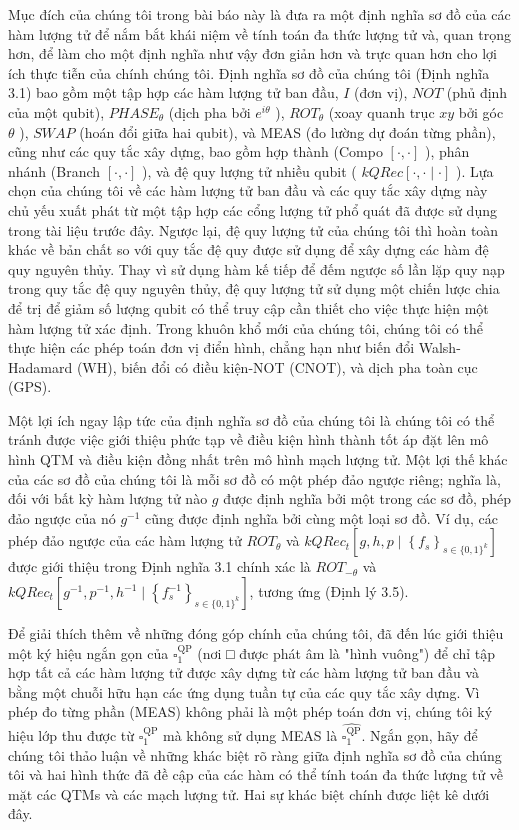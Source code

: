 \documentclass[10pt]{article}
\begin{document}
Mục đích của chúng tôi trong bài báo này là đưa ra một định nghĩa sơ đồ của các hàm lượng tử để nắm bắt khái niệm về tính toán đa thức lượng tử và, quan trọng hơn, để làm cho một định nghĩa như vậy đơn giản hơn và trực quan hơn cho lợi ích thực tiễn của chính chúng tôi. Định nghĩa sơ đồ của chúng tôi (Định nghĩa 3.1) bao gồm một tập hợp các hàm lượng tử ban đầu, $I$ (đơn vị), $N O T$ (phủ định của một qubit), $P H A S E_{\theta}$ (dịch pha bởi $e^{i \theta}$ ), $R O T_{\theta}$ (xoay quanh trục $x y$ bởi góc $\theta$ ), $S W A P$ (hoán đổi giữa hai qubit), và MEAS (đo lường dự đoán từng phần), cũng như các quy tắc xây dựng, bao gồm hợp thành (Compo $[\cdot, \cdot]$ ), phân nhánh (Branch $[\cdot, \cdot]$ ), và đệ quy lượng tử nhiều qubit ( $k Q R e c[\cdot, \cdot \mid \cdot]$ ). Lựa chọn của chúng tôi về các hàm lượng tử ban đầu và các quy tắc xây dựng này chủ yếu xuất phát từ một tập hợp các cổng lượng tử phổ quát đã được sử dụng trong tài liệu trước đây. Ngược lại, đệ quy lượng tử của chúng tôi thì hoàn toàn khác về bản chất so với quy tắc đệ quy được sử dụng để xây dựng các hàm đệ quy nguyên thủy. Thay vì sử dụng hàm kế tiếp để đếm ngược số lần lặp quy nạp trong quy tắc đệ quy nguyên thủy, đệ quy lượng tử sử dụng một chiến lược chia để trị để giảm số lượng qubit có thể truy cập cần thiết cho việc thực hiện một hàm lượng tử xác định. Trong khuôn khổ mới của chúng tôi, chúng tôi có thể thực hiện các phép toán đơn vị điển hình, chẳng hạn như biến đổi Walsh-Hadamard (WH), biến đổi có điều kiện-NOT (CNOT), và dịch pha toàn cục (GPS).

Một lợi ích ngay lập tức của định nghĩa sơ đồ của chúng tôi là chúng tôi có thể tránh được việc giới thiệu phức tạp về điều kiện hình thành tốt áp đặt lên mô hình QTM và điều kiện đồng nhất trên mô hình mạch lượng tử. Một lợi thế khác của các sơ đồ của chúng tôi là mỗi sơ đồ có một phép đảo ngược riêng; nghĩa là, đối với bất kỳ hàm lượng tử nào $g$ được định nghĩa bởi một trong các sơ đồ, phép đảo ngược của nó $g^{-1}$ cũng được định nghĩa bởi cùng một loại sơ đồ. Ví dụ, các phép đảo ngược của các hàm lượng tử $R O T_{\theta}$ và $k Q R e c_{t}\left[g, h, p \mid\left\{f_{s}\right\}_{s \in\{0,1\}^{k}}\right]$ được giới thiệu trong Định nghĩa 3.1 chính xác là $R O T_{-\theta}$ và $k Q R e c_{t}\left[g^{-1}, p^{-1}, h^{-1} \mid\left\{f_{s}^{-1}\right\}_{s \in\{0,1\}^{k}}\right]$, tương ứng (Định lý 3.5).

Để giải thích thêm về những đóng góp chính của chúng tôi, đã đến lúc giới thiệu một ký hiệu ngắn gọn của $\square_{1}^{\mathrm{QP}}$ (nơi □ được phát âm là "hình vuông") để chỉ tập hợp tất cả các hàm lượng tử được xây dựng từ các hàm lượng tử ban đầu và bằng một chuỗi hữu hạn các ứng dụng tuần tự của các quy tắc xây dựng. Vì phép đo từng phần (MEAS) không phải là một phép toán đơn vị, chúng tôi ký hiệu lớp thu được từ $\square_{1}^{\mathrm{QP}}$ mà không sử dụng MEAS là $\widehat{\square_{1}^{\mathrm{QP}}}$. Ngắn gọn, hãy để chúng tôi thảo luận về những khác biệt rõ ràng giữa định nghĩa sơ đồ của chúng tôi và hai hình thức đã đề cập của các hàm có thể tính toán đa thức lượng tử về mặt các QTMs và các mạch lượng tử. Hai sự khác biệt chính được liệt kê dưới đây.
\end{document}
